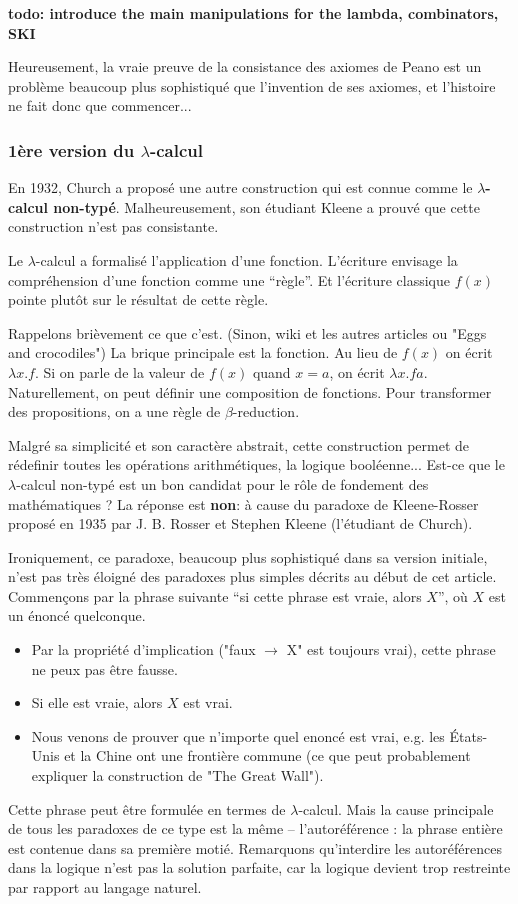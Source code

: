\documentclass[12pt, a4paper]{article}
\begin{document}
\textbf{todo: introduce the main manipulations for the lambda, combinators, SKI}

Heureusement, la vraie preuve de la consistance des axiomes de Peano est un problème beaucoup plus sophistiqué que l'invention de ses axiomes, et l'histoire ne fait donc que commencer...

\subsubsection*{1ère version du $\lambda$-calcul}
En 1932, Church a proposé une autre construction qui est connue comme le \textbf{$\lambda$-calcul non-typé}. Malheureusement, son étudiant Kleene a prouvé que cette construction n'est pas consistante.

Le $\lambda$-calcul a formalisé l'application d'une fonction. L'écriture envisage la compréhension d'une fonction comme une ``règle''. Et l'écriture classique $f(x)$ pointe plutôt sur le résultat de cette règle.

Rappelons brièvement ce que c'est. (Sinon, wiki et les autres articles ou "Eggs and crocodiles")
La brique principale est la fonction.
Au lieu de $f(x)$ on écrit $\lambda x.f$.
Si on parle de la valeur de $f(x)$ quand $x=a$, on écrit $\lambda x.f a$.
Naturellement, on peut définir une composition de fonctions.
Pour transformer des propositions, on a une règle de $\beta$-reduction.

Malgré sa simplicité et son caractère abstrait, cette construction permet de rédefinir toutes les opérations arithmétiques, la logique booléenne...
Est-ce que le $\lambda$-calcul non-typé est un bon candidat pour le rôle de fondement des mathématiques ?
La réponse est \textbf{non}: à cause du paradoxe de Kleene-Rosser proposé en 1935 par J. B. Rosser et Stephen Kleene (l'étudiant de Church).

Ironiquement, ce paradoxe, beaucoup plus sophistiqué dans sa version initiale, n'est pas très éloigné des paradoxes plus simples décrits au début de cet article.
Commençons par la phrase suivante ``si cette phrase est vraie, alors $X$'', où $X$ est un énoncé quelconque.
\begin{itemize}
	\item Par la propriété d'implication ("faux $\to$ X" est toujours vrai), cette phrase ne peux pas être fausse.
	\item Si elle est vraie, alors $X$ est vrai.
	\item Nous venons de prouver que n'importe quel enoncé est vrai, e.g. les États-Unis et la Chine ont une frontière commune (ce que peut probablement expliquer la construction de "The Great Wall").
\end{itemize}
Cette phrase peut être formulée en termes de $\lambda$-calcul.
Mais la cause principale de tous les paradoxes de ce type est la même -- l'autoréférence : la phrase entière est contenue dans sa première motié.
Remarquons qu'interdire les autoréférences dans la logique n'est pas la solution parfaite, car la logique devient trop restreinte par rapport au langage naturel.
\end{document}
